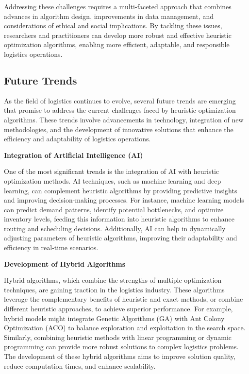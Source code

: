 \documentclass[
]{article}
\begin{document}
    Addressing these challenges requires a multi-faceted approach that combines advances in algorithm design, improvements in data management, and considerations of ethical and social implications. By tackling these issues, researchers and practitioners can develop more robust and effective heuristic optimization algorithms, enabling more efficient, adaptable, and responsible logistics operations.

    \subsection{Future Trends}\label{subsec:future-trends}

    As the field of logistics continues to evolve, several future trends are emerging that promise to address the current challenges faced by heuristic optimization algorithms. These trends involve advancements in technology, integration of new methodologies, and the development of innovative solutions that enhance the efficiency and adaptability of logistics operations.

    \textbf{Integration of Artificial Intelligence (AI)}

    One of the most significant trends is the integration of AI with heuristic optimization methods. AI techniques, such as machine learning and deep learning, can complement heuristic algorithms by providing predictive insights and improving decision-making processes. For instance, machine learning models can predict demand patterns, identify potential bottlenecks, and optimize inventory levels, feeding this information into heuristic algorithms to enhance routing and scheduling decisions. Additionally, AI can help in dynamically adjusting parameters of heuristic algorithms, improving their adaptability and efficiency in real-time scenarios.

    \textbf{Development of Hybrid Algorithms}

    Hybrid algorithms, which combine the strengths of multiple optimization techniques, are gaining traction in the logistics industry. These algorithms leverage the complementary benefits of heuristic and exact methods, or combine different heuristic approaches, to achieve superior performance. For example, hybrid models might integrate Genetic Algorithms (GA) with Ant Colony Optimization (ACO) to balance exploration and exploitation in the search space. Similarly, combining heuristic methods with linear programming or dynamic programming can provide more robust solutions to complex logistics problems. The development of these hybrid algorithms aims to improve solution quality, reduce computation times, and enhance scalability.
\end{document}
